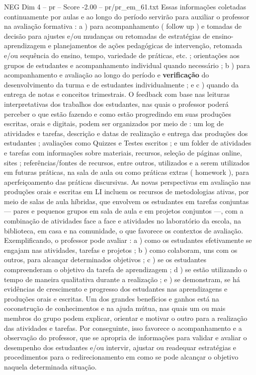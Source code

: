 \begin{textsample}{NEG Dim 4 – pr – Score -2.00 – pr/pr\_em\_61.txt}
Essas informações coletadas continuamente por aulas e ao longo do período servirão para auxiliar o professor na avaliação formativa : a ) para acompanhamento ( follow up ) e tomadas de decisão para ajustes e/ou mudanças ou retomadas de estratégias de ensino-aprendizagem e planejamentos de ações pedagógicas de intervenção, retomada e/ou sequência do ensino, tempo, variedade de práticas, etc. ; orientações aos grupos de estudantes e acompanhamento individual quando necessário ; b ) para acompanhamento e avaliação ao longo do período e \textbf{verificação} do desenvolvimento da turma e de estudantes individualmente ; e c ) quando da entrega de notas e conceitos trimestrais.
O feedback com base nas leituras interpretativas dos trabalhos dos estudantes, nas quais o professor poderá perceber o que estão fazendo e como estão progredindo em suas produções escritas, orais e digitais, podem ser organizados por meio de : um log de atividades e tarefas, descrição e datas de realização e entrega das produções dos estudantes ; avaliações como Quizzes e Testes escritos ; e um folder de atividades e tarefas com informações sobre materiais, recursos, seleção de páginas online, sites ; referências/fontes de recursos, entre outros, utilizados e a serem utilizados em futuras práticas, na sala de aula ou como práticas extras ( homework ), para aperfeiçoamento das práticas discursivas.
As novas perspectivas em avaliação nas produções orais e escritas em LI incluem os recursos de metodologias ativas, por meio de salas de aula híbridas, que envolvem os estudantes em tarefas conjuntas — pares e pequenos grupos em sala de aula e em projetos conjuntos —, com a combinação de atividades face a face e atividades no laboratório da escola, na biblioteca, em casa e na comunidade, o que favorece os contextos de avaliação.
Exemplificando, o professor pode avaliar : a ) como os estudantes efetivamente se engajam nas atividades, tarefas e projetos ; b ) como colaboram, uns com os outros, para alcançar determinados objetivos ; c ) se os estudantes compreenderam o objetivo da tarefa de aprendizagem ; d ) se estão utilizando o tempo de maneira qualitativa durante a realização ; e ) se demonstram, se há evidências de crescimento e progresso dos estudantes nas aprendizagens e produções orais e escritas.
Um dos grandes benefícios e ganhos está na coconstrução de conhecimentos e na ajuda mútua, nas quais um ou mais membros do grupo podem explicar, orientar e motivar o outro para a realização das atividades e tarefas.
Por conseguinte, isso favorece o acompanhamento e a observação do professor, que se apropria de informações para validar e avaliar o desempenho dos estudantes e/ou intervir, ajustar ou readequar estratégias e procedimentos para o redirecionamento em como se pode alcançar o objetivo naquela determinada situação.

\end{textsample}
